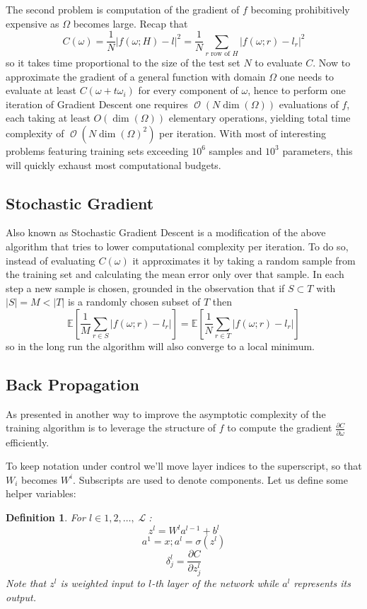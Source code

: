 \documentclass[a4paper]{article}
\theoremstyle{break}
\newtheorem{definition}{Definition}[section]
\newcommand{\Exp}{\mathbb{E}}
\newcommand{\Part}[2]{\frac{\partial #1}{\partial #2}}
\DeclareMathOperator{\La}{\mathcal{L}}
\DeclareMathOperator{\bO}{\mathcal{O}}
\begin{document}
The second problem is computation of the gradient of $f$ becoming prohibitively expensive as $ \Omega $ becomes large. Recap that
    $$ C(\omega) =  \frac{1}{N} | f(\omega; H) - l |^2 =
       \frac{1}{N} \sum_{r \text{ row of } H} | f(\omega; r) - l_r |^2 $$
so it takes time proportional to the size of the test set $N$ to evaluate $C$.
Now to approximate the gradient of a general function with domain $ \Omega $ one needs to evaluate at least $C(\omega + t \omega_i)$ for every component of $ \omega $, hence to perform one iteration of Gradient Descent one requires $ \bO( N  \dim(\Omega) ) $ evaluations of $f$,
each taking at least $ O( \dim(\Omega))$ elementary operations, yielding total time complexity of $ \bO( N \dim(\Omega)^2)$ per iteration. With most of interesting problems featuring training sets exceeding $ 10^6 $ samples and $ 10^3 $ parameters, this will quickly exhaust most computational budgets.

\subsection{Stochastic Gradient}
Also known as Stochastic Gradient Descent is a modification of the above algorithm that tries to lower computational complexity per iteration. To do so, instead of evaluating $C(\omega)$ it approximates it by taking a random sample from the training set and calculating the mean error only over that sample. In each step a new sample is chosen, grounded in the observation that if $ S \subset T $ with $ | S | = M < |T| $ is a randomly chosen subset of $T$ then
    $$ \Exp \left[ \frac{1}{M} \sum_{r \in S} | f(\omega; r) - l_r | \right] =
       \Exp \left[ \frac{1}{N} \sum_{r \in T} | f(\omega; r) - l_r | \right] $$
so in the long run the algorithm will also converge to a local minimum.


\subsection{Back Propagation}
As presented in \cite[pp11-14]{higham} another way to improve the asymptotic complexity of the training algorithm is to leverage the structure of $f$ to compute the gradient $ \frac{\partial C}{\partial \omega} $ efficiently.

To keep notation under control we'll move layer indices to the superscript, so that $W_i$ becomes $ W^i $. Subscripts are used to denote components. Let us define some helper variables:
\begin{definition}\label{def:back_prop_helper}
For $ l \in {1, 2, \ldots, \La} $:
    $$ z^l = W^l a^{l-1} + b^{l} $$
    $$ a^1 = x; a^l = \sigma( z^l ) $$
    $$ \delta^l_j = \Part{C}{ z_j^l } $$
Note that $z^l$ is weighted input to $l$-th layer of the network while $a^l$ represents its output.
\end{definition}
\end{document}
